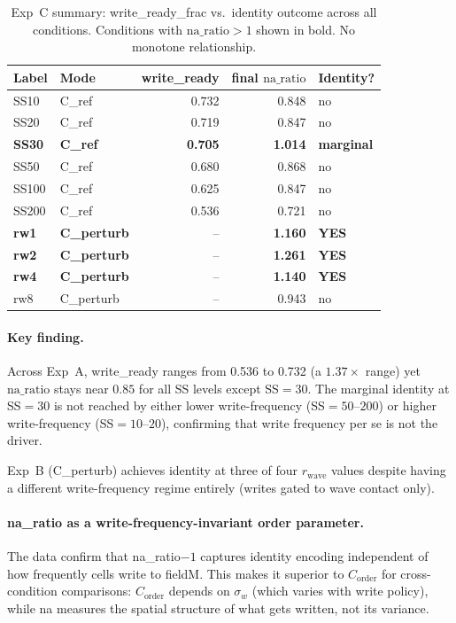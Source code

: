\documentclass[11pt,a4paper]{article}
\newcommand{\Corder}{C_{\mathrm{order}}}
\newcommand{\sw}{\sigma_w}
\newcommand{\na}{\mathrm{na\_ratio}}
\begin{document}
\begin{table}[h]
\centering
\caption{Exp~C summary: write\_ready\_frac vs.\ identity outcome across all conditions.
Conditions with $\na > 1$ shown in bold. No monotone relationship.}
\label{tab:expc}
\begin{tabular}{llrrl}
\toprule
Label & Mode & write\_ready & final $\na$ & Identity? \\
\midrule
SS10   & C\_ref      & 0.732 & 0.848 & no  \\
SS20   & C\_ref      & 0.719 & 0.847 & no  \\
\textbf{SS30}   & \textbf{C\_ref}      & \textbf{0.705} & \textbf{1.014} & \textbf{marginal} \\
SS50   & C\_ref      & 0.680 & 0.868 & no  \\
SS100  & C\_ref      & 0.625 & 0.847 & no  \\
SS200  & C\_ref      & 0.536 & 0.721 & no  \\
\midrule
\textbf{rw1}    & \textbf{C\_perturb}  & -- & \textbf{1.160} & \textbf{YES} \\
\textbf{rw2}    & \textbf{C\_perturb}  & -- & \textbf{1.261} & \textbf{YES} \\
\textbf{rw4}    & \textbf{C\_perturb}  & -- & \textbf{1.140} & \textbf{YES} \\
rw8    & C\_perturb  & -- & 0.943 & no  \\
\bottomrule
\end{tabular}
\end{table}

\paragraph{Key finding.}
Across Exp~A, write\_ready ranges from 0.536 to 0.732 (a $1.37\times$ range)
yet $\na$ stays near $0.85$ for all SS levels except SS$=30$.
The marginal identity at SS$=30$ is not reached by either lower write-frequency
(SS$=50$--$200$) or higher write-frequency (SS$=10$--$20$), confirming that
write frequency per se is not the driver.

Exp~B (C\_perturb) achieves identity at three of four $r_\mathrm{wave}$ values despite
having a different write-frequency regime entirely (writes gated to wave contact only).

\paragraph{na\_ratio as a write-frequency-invariant order parameter.}
The data confirm that na\_ratio$-1$ captures identity encoding independent
of how frequently cells write to fieldM. This makes it superior to $\Corder$
for cross-condition comparisons: $\Corder$ depends on $\sw$ (which varies
with write policy), while na measures the spatial structure of what gets written,
not its variance.
\end{document}
